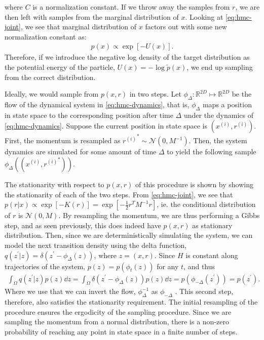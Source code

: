 where $C$ is a normalization constant.
If we throw away the samples from $r$, we are then left with samples from the marginal distribution of $x$.
Looking at \cref{eq:hmc-joint}, we see that marginal distribution of $x$ factors out with some new normalization constant as:
\begin{align}
    p(x) \propto \exp[-U(x)].
\end{align}
Therefore, if we introduce the negative log density of the target distribution as the potential energy of the particle, $U(x) = -\log{\tilde{p}(x)}$, we end up sampling from the correct distribution.

\newcommand{\newx}{x^{\prime}}
\newcommand{\newr}{{r^{\prime}}}
\newcommand{\oldx}{{x^{(i)}}}
\newcommand{\oldr}{{r^{(i)}}}
\newcommand{\nextx}{x^{(i+1)}}
\newcommand{\nextr}{{r^{(i+1)}}}

Ideally, we would sample from $p(x, r)$ in two steps.
Let $\phi_\Delta: \mathbb{R}^{2D} \mapsto \mathbb{R}^{2D}$ be the flow of the dynamical system in \cref{eq:hmc-dynamics}, that is, $\phi_\Delta$ maps a position in state space to the corresponding position after time $\Delta$ under the dynamics of \cref{eq:hmc-dynamics}.
Suppose the current position in state space is $(\oldx, \oldr)$. 
First, the momentum is resampled as $\oldr^\ast\sim \mathcal{N}(0, M^{-1})$.
Then, the system dynamics are simulated for some amount of time $\Delta$ to yield the following sample $\phi_\Delta((\oldx, \oldr^\ast))$.

The stationarity with respect to $p(x, r)$ of this procedure is shown by showing the stationarity of each of the two steps.
From \cref{eq:hmc-joint}, we see that $p(r|x) \propto \exp[-K(r)] = \exp[-\frac{1}{2}r^TM^{-1}r]$, ie. the conditional distribution of $r$ is $\mathcal{N}(0, M)$.
By resampling the momentum, we are thus performing a Gibbs step, and as seen previously, this does indeed have $p(x, r)$ as stationary distribution.
Then, since we are deterministically simulating the system, we can model the next transition density using the delta function, $q(z^\prime|z) = \delta(z^\prime - \phi_\Delta(z))$, where $z=(x, r)$. 
Since $H$ is constant along trajectories of the system, $p(z) =p(\phi_t(z))$ for any $t$, and thus
\begin{align} \label{eq:}
    \int_{\Omega} q(z^\prime| z ) p(z) \dd{z} = \int_{\Omega} \delta(z^\prime - \phi_\Delta(z))p(z) \dd{z} 
    = p(\phi_{-\Delta}(z^\prime)) = p(z^\prime).
\end{align}
Where we use that we can invert the flow, $\phi^{-1}_\Delta$ as $\phi_{-\Delta}$ \autocite{perko_differential_1991}. 
This second step, therefore, also satisfies the stationarity requirement.
The initial resampling of the procedure ensures the ergodicity of the sampling procedure.
Since we are sampling the momentum from a normal distribution, there is a non-zero probability of reaching any point in state space in a finite number of steps.

